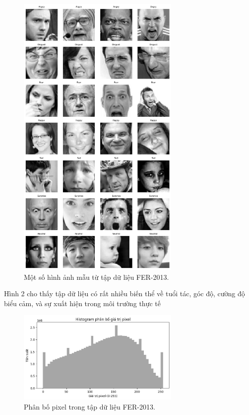 \begin{figure}[H]
    \centering
    \includegraphics[width=0.7\textwidth]{img/truc_quan_anh_mau.png} %
    \caption{Một số hình ảnh mẫu từ tập dữ liệu FER-2013.}
    \label{fig:sample_images}
\end{figure}
Hình 2 cho thấy tập dữ liệu có rất nhiều biến thể về tuổi tác, góc độ, cường độ
biểu cảm, và sự xuất hiện trong môi trường thực tế
\begin{figure}[H]
    \centering
    \includegraphics[width=0.7\textwidth]{img/phan_bo_pixel.png} %
    \caption{Phân bố pixel trong tập dữ liệu FER-2013.}
    \label{fig:pixel_distribution}
\end{figure}

